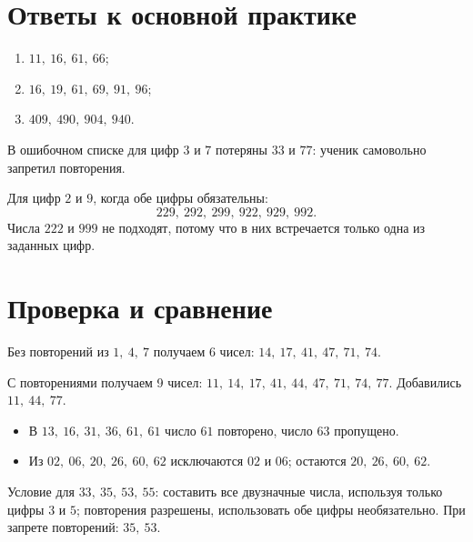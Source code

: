 \newpage
\section{Ответы к основной практике}

\begin{teacherbox}
  \begin{enumerate}
    \item \(11,\ 16,\ 61,\ 66\);
    \item \(16,\ 19,\ 61,\ 69,\ 91,\ 96\);
    \item \(409,\ 490,\ 904,\ 940\).
  \end{enumerate}
\end{teacherbox}

В ошибочном списке для цифр \(3\) и \(7\) потеряны \(33\) и \(77\): ученик
самовольно запретил повторения.

Для цифр \(2\) и \(9\), когда обе цифры обязательны:
\[
  229,\ 292,\ 299,\ 922,\ 929,\ 992.
\]
Числа \(222\) и \(999\) не подходят, потому что в них встречается только одна
из заданных цифр.

\section{Проверка и сравнение}

\begin{teacherbox}
  Без повторений из \(1,\ 4,\ 7\) получаем 6 чисел:
  \(14,\ 17,\ 41,\ 47,\ 71,\ 74\).

  С повторениями получаем 9 чисел:
  \(11,\ 14,\ 17,\ 41,\ 44,\ 47,\ 71,\ 74,\ 77\).
  Добавились \(11,\ 44,\ 77\).
\end{teacherbox}

\begin{teacherbox}
  \begin{itemize}
    \item В \(13,\ 16,\ 31,\ 36,\ 61,\ 61\) число \(61\) повторено, число
      \(63\) пропущено.
    \item Из \(02,\ 06,\ 20,\ 26,\ 60,\ 62\) исключаются \(02\) и \(06\);
      остаются \(20,\ 26,\ 60,\ 62\).
  \end{itemize}
\end{teacherbox}

Условие для \(33,\ 35,\ 53,\ 55\): составить все двузначные числа, используя
только цифры \(3\) и \(5\); повторения разрешены, использовать обе цифры
необязательно.
При запрете повторений: \(35,\ 53\).

